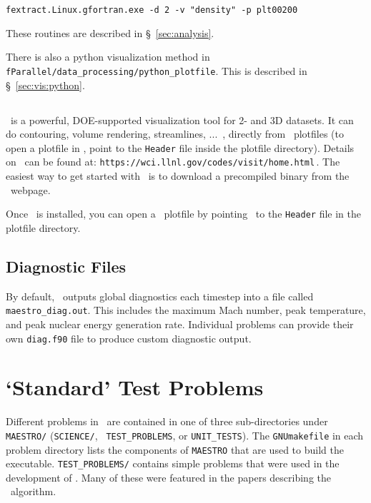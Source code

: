 \begin{verbatim}
fextract.Linux.gfortran.exe -d 2 -v "density" -p plt00200
\end{verbatim}

These routines are described in \S~\ref{sec:analysis}.

There is also a python visualization method in {\tt
fParallel/data\_processing/python\_plotfile}.  This is described
in \S~\ref{sec:vis:python}.


\subsection{\visit}

\visit\ is a powerful, DOE-supported visualization tool for 2- and 3D
datasets.  It can do contouring, volume rendering, streamlines, ...\, ,
directly from \boxlib\ plotfiles (to open a plotfile in \visit, point to
the {\tt Header} file inside the plotfile directory).  Details on
\visit\ can be found at:\newline
 {\tt https://wci.llnl.gov/codes/visit/home.html}\,. \newline
The easiest way to get started with \visit\ is to download a precompiled
binary from the \visit\ webpage.

Once \visit\ is installed, you can open a \boxlib\ plotfile by pointing
\visit\ to the {\tt Header} file in the plotfile directory.

\subsection{Diagnostic Files}

By default, \maestro\ outputs global diagnostics each timestep into a file
called {\tt maestro\_diag.out}.  This includes the maximum Mach number,
peak temperature, and peak nuclear energy generation rate.  Individual problems
can provide their own {\tt diag.f90} file to produce custom diagnostic
output.





\section{`Standard' Test Problems}

Different problems in \maestro\ are contained in one of three
sub-directories under {\tt MAESTRO/} ({\tt SCIENCE/}, {\tt
TEST\_PROBLEMS}, or {\tt UNIT\_TESTS}).  The {\tt GNUmakefile} in each
problem directory lists the components of {\tt MAESTRO} that are used
to build the executable.  {\tt TEST\_PROBLEMS/} contains simple
problems that were used in the development of \maestro.  Many
of these were featured in the papers describing the \maestro\ algorithm.

